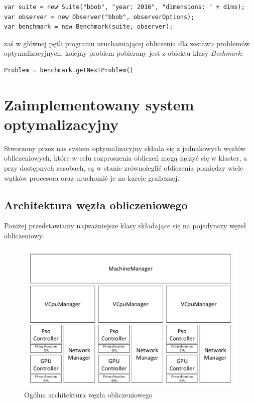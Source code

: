 \documentclass[12pt, twoside, openany, abstract=on]{report}
\theoremstyle{definition}
\begin{document}
\begin{lstlisting}[frame=single]
var suite = new Suite("bbob", "year: 2016", "dimensions: " + dims);
var observer = new Observer("bbob", observerOptions);
var benchmark = new Benchmark(suite, observer);
\end{lstlisting}

zaś w głównej pętli programu uruchamiającej obliczenia dla zestawu problemów optymalizacyjnych, kolejny problem pobierany jest z obiektu klasy \textit{Bechmark}:

\begin{lstlisting}[frame=single]
Problem = benchmark.getNextProblem()
\end{lstlisting}


\chapter{Zaimplementowany system optymalizacyjny}

Stworzony przez nas system optymalizacyjny składa się z jednakowych węzłów obliczeniowych, które w celu rozproszenia obliczeń mogą łączyć się w klaster, a przy dostępnych zasobach, są w stanie zrównoleglić obliczenia pomiędzy wiele wątków procesora oraz uruchomić je na karcie graficznej.


\section{Architektura węzła obliczeniowego}

Poniżej przedstawiamy najważniejsze klasy składające się na pojedynczy węzeł obliczeniowy. 

\begin{figure}[H]
    \centering
    \includegraphics[scale=0.7]{WezlaArchNewh.pdf} 
 \caption{Ogólna architektura węzła obliczeniowego}
\end{figure}
\end{document}
